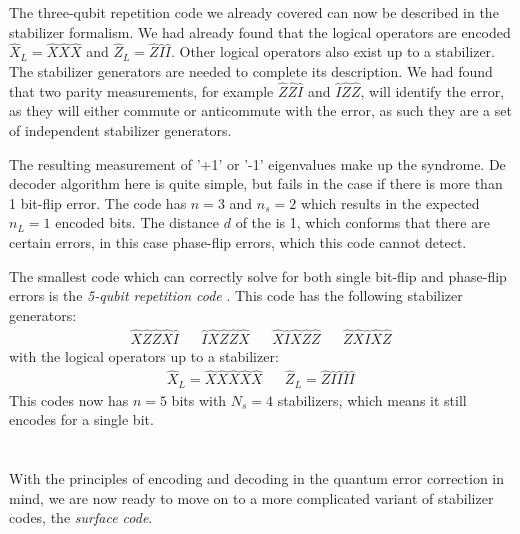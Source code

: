 The three-qubit repetition code we already covered can now be described in the stabilizer formalism. We had already found that the logical operators are encoded $\hat{X}_L = \hat{X}\hat{X}\hat{X}$ and $\hat{Z}_L = \hat{Z}\hat{I}\hat{I}$. Other logical operators also exist up to a stabilizer. The stabilizer generators are needed to complete its description. We had found that two parity measurements, for example $\hat{Z}\hat{Z}\hat{I}$ and $\hat{I}\hat{Z}\hat{Z}$, will identify the error, as they will either commute or anticommute with the error, as such they are a set of independent stabilizer generators. 

The resulting measurement of '+1' or '-1' eigenvalues make up the syndrome. De decoder algorithm here is quite simple, but fails in the case if there is more than 1 bit-flip error. The code has $n=3$ and $n_s=2$ which results in the expected $n_L = 1$ encoded bits. The distance $d$ of the is 1, which conforms that there are certain errors, in this case phase-flip errors, which this code cannot detect.

The smallest code which can correctly solve for both single bit-flip and phase-flip errors is the \emph{5-qubit repetition code} \cite{laflamme1996perfect}. This code has the following stabilizer generators:
\begin{align}
  \hat{X}\hat{Z}\hat{Z}\hat{X}\hat{I} && \hat{I}\hat{X}\hat{Z}\hat{Z}\hat{X} && \hat{X}\hat{I}\hat{X}\hat{Z}\hat{Z} && \hat{Z}\hat{X}\hat{I}\hat{X}\hat{Z}
\end{align}
with the logical operators up to a stabilizer:
\begin{align}
  & \hat{X}_L = \hat{X}\hat{X}\hat{X}\hat{X}\hat{X} && \hat{Z}_L = \hat{Z}\hat{I}\hat{I}\hat{I}\hat{I} &
\end{align}
This codes now has $n=5$ bits with $N_s = 4$ stabilizers, which means it still encodes for a single bit.\\
\\
\\
With the principles of encoding and decoding in the quantum error correction in mind, we are now ready to move on to a more complicated variant of stabilizer codes, the \emph{surface code}. 


